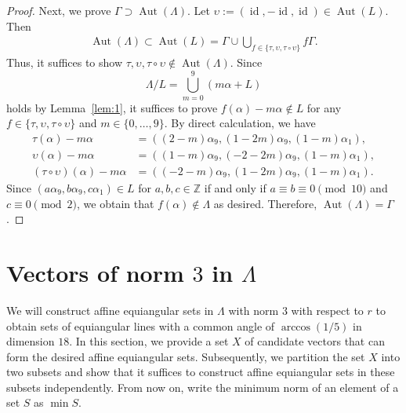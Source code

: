 \documentclass[reqno, 11pt]{amsart}
\numberwithin{equation}{section}
\theoremstyle{definition}
\DeclareMathOperator{\Aut}{Aut}
\DeclareMathOperator{\id}{id}
\newcommand{\Z}{\mathbb{Z}}
\newcommand{\sr}{ r } %
\begin{document}
\begin{proof}
	Next, we prove $\Gamma \supset \Aut(\Lambda)$.
Let $\upsilon := (\id, -\id, \id ) \in \Aut(L)$.
Then
	\begin{align*}
\Aut(\Lambda)\subset\Aut(L)=\Gamma\cup
\bigcup_{f\in\{\tau, \upsilon, \tau \circ \upsilon\}} f\Gamma.
	\end{align*}
Thus, it suffices to show $\tau, \upsilon, \tau \circ \upsilon \not\in \Aut(\Lambda)$.
Since
	$$\Lambda / L = \bigcup_{m=0}^{9} \left( m\alpha+L \right)$$ 
	holds by Lemma~\ref{lem:1}, 
	it suffices to prove $f(\alpha) - m \alpha \not\in L$ for any 
	$f\in\{\tau, \upsilon, \tau \circ \upsilon\}$ and 
	$m \in \{0,\ldots,9\}$.
	By direct calculation, we have 
	\begin{align*}
		\tau(\alpha) - m \alpha
		&= \left((2-m)\alpha_9, (1-2m)\alpha_9, (1-m)\alpha_1 \right),\\
		\upsilon(\alpha) - m \alpha
		&= \left((1-m)\alpha_9, (-2-2m)\alpha_9, (1-m)\alpha_1 \right),\\
		(\tau \circ \upsilon)(\alpha) - m \alpha
		&= \left((-2-m)\alpha_9, (1-2m)\alpha_9, (1-m)\alpha_1 \right).
	\end{align*}
	Since $(a \alpha_9, b \alpha_9, c \alpha_1) \in L$ for $a,b,c \in \Z$ if and only if $a \equiv b \equiv 0 \pmod{10}$ and $c \equiv 0 \pmod{2}$,
	we obtain that $f(\alpha) \not\in \Lambda$ as desired.
	Therefore, $\Aut(\Lambda) = \Gamma$.
\end{proof}


\section{Vectors of norm $3$ in $\Lambda$}	\label{sec:3}
We will construct affine equiangular sets in $\Lambda$ with norm $3$ with respect to $\sr$ to obtain sets of equiangular lines with a common angle of $\arccos(1/5)$ in dimension $18$.
In this section, we provide a set $X$ of candidate vectors that can form the desired affine equiangular sets.
Subsequently, we partition the set $X$ into two subsets and show that it suffices to construct affine equiangular sets in these subsets independently.
From now on, write the minimum norm of an element of a set $S$ as $\min S$.
\end{document}

